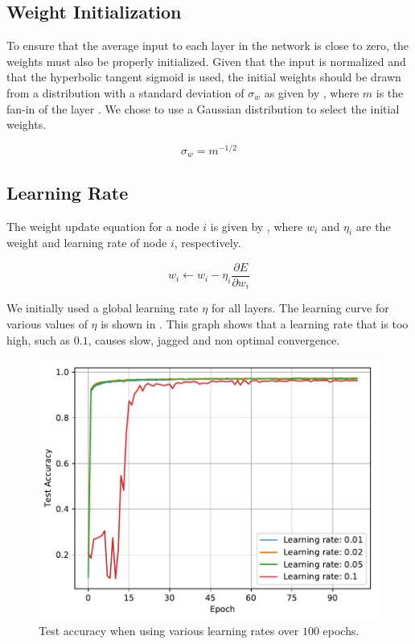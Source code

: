 \documentclass[journal,hidelinks]{IEEEtran}
\begin{document}
\subsection{Weight Initialization}

To ensure that the average input to each layer in the network is close to zero, the weights must also be properly initialized. Given that the input is normalized and that the hyperbolic tangent sigmoid is used, the initial weights should be drawn from a distribution with a standard deviation of $\sigma_w$ as given by , where $m$ is the fan-in of the layer \cite{lecun_efficient_1998}. We chose to use a Gaussian distribution to select the initial weights.

\begin{equation} \label{eq:weight_init}
\sigma_w = m^{-1/2}
\end{equation}

\subsection{Learning Rate}

The weight update equation for a node $i$ is given by , where $w_i$ and $\eta_i$ are the weight and learning rate of node $i$, respectively.

\begin{equation} \label{eq:weight_update}
w_i \leftarrow w_i - \eta_i \frac{\partial E}{\partial w_i}
\end{equation}

We initially used a global learning rate $\eta$ for all layers. The learning curve for various values of $\eta$ is shown in . This graph shows that a learning rate that is too high, such as $0.1$, causes slow, jagged and non optimal convergence.

\begin{figure}[!htb]
  \centering
  \includegraphics[width=0.8\columnwidth]{plots/learning_rate.pdf}
  \caption{Test accuracy when using various learning rates over $100$ epochs.}
  \label{fig:learning_rate}
\end{figure}
\end{document}
